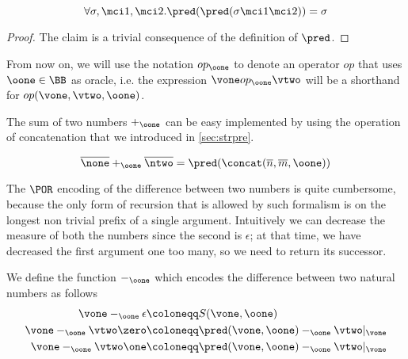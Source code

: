 \begin{remark}
\[
\forall \sigma, \mci 1, \mci 2. \pred(\pred(\sigma\mci1\mci2))=\sigma
\]
\end{remark}

\begin{proof}
The claim is a trivial consequence of the definition of $\pred$.
\end{proof}

\begin{notation}
From now on, we will use the notation $op_\oone$ to denote an operator $op$ that uses $\oone \in \BB$ as oracle, i.e. the expression $\vone op_\oone \vtwo$ will be a shorthand for $op(\vone, \vtwo, \oone)$.
\end{notation}

\begin{defn}
The sum of two numbers $+_\oone$ can be easy implemented by using the operation of concatenation that we introduced in \ref{sec:strpre}.

\[
\overline \none +_\oone \overline \ntwo = \pred(\concat(\overline n, \overline m, \oone))
\]
\end{defn}


The $\POR$ encoding of the difference between two numbers is quite cumbersome, because the only form of recursion that is allowed by such formalism is on the longest non trivial prefix of a single argument. Intuitively we can decrease the measure of both the numbers since the second is $\epsilon$; at that time, we have decreased the first argument one too many, so we need to return its successor.

\begin{defn}
We define the function $-_\oone$ which encodes the difference between two natural numbers as follows
\begin{align*}
\vone -_\oone \epsilon &\coloneqq S(\vone, \oone)\\
\vone -_\oone \vtwo\zero &\coloneqq \pred(\vone, \oone) -_\oone \vtwo|_{\vone}\\
\vone -_\oone \vtwo\one &\coloneqq \pred(\vone, \oone) -_\oone \vtwo|_{\vone}\\
\end{align*}
\end{defn}

